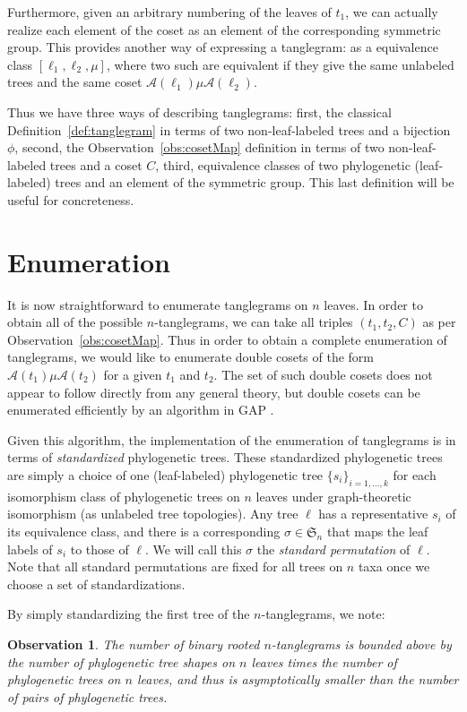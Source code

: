 \documentclass{amsart}
\newtheorem{observation}{Observation}
\newcommand{\fS}{\mathfrak S}
\newcommand{\aut}{\mathcal A}
\newcommand{\pairing}{\mu}
\begin{document}
Furthermore, given an arbitrary numbering of the leaves of $t_1$, we can actually realize each element of the coset as an element of the corresponding symmetric group.
This provides another way of expressing a tanglegram: as a equivalence class $[\ell_1, \ell_2, \pairing]$, where two such are equivalent if they give the same unlabeled trees and the same coset $\aut(\ell_1) \pairing \aut(\ell_2)$.

Thus we have three ways of describing tanglegrams:
first, the classical Definition~\ref{def:tanglegram} in terms of two non-leaf-labeled trees and a bijection $\phi$,
second, the Observation~\ref{obs:cosetMap} definition in terms of two non-leaf-labeled trees and a coset $C$,
third, equivalence classes of two phylogenetic (leaf-labeled) trees and an element of the symmetric group.
This last definition will be useful for concreteness.


\section{Enumeration}
It is now straightforward to enumerate tanglegrams on $n$ leaves.
In order to obtain all of the possible $n$-tanglegrams, we can take all triples $(t_1, t_2, C)$ as per Observation~\ref{obs:cosetMap}.
Thus in order to obtain a complete enumeration of tanglegrams, we would like to enumerate double cosets of the form $\aut(t_1) \pairing \aut(t_2)$ for a given $t_1$ and $t_2$.
The set of such double cosets does not appear to follow directly from any general theory, but double cosets can be enumerated efficiently by an algorithm in GAP \cite{GAP4}.

Given this algorithm, the implementation of the enumeration of tanglegrams is in terms of \emph{standardized} phylogenetic trees.
These standardized phylogenetic trees are simply a choice of one (leaf-labeled) phylogenetic tree $\{s_i\}_{i=1,\ldots,k}$ for each isomorphism class of phylogenetic trees on $n$ leaves under graph-theoretic isomorphism (as unlabeled tree topologies).
Any tree $\ell$ has a representative $s_i$ of its equivalence class, and there is a corresponding $\sigma \in \fS_n$ that maps the leaf labels of $s_i$ to those of $\ell$.
We will call this $\sigma$ the \emph{standard permutation} of $\ell$.
Note that all standard permutations are fixed for all trees on $n$ taxa once we choose a set of standardizations.

By simply standardizing the first tree of the $n$-tanglegrams, we note:
\begin{observation}
\label{obs:count}
The number of binary rooted $n$-tanglegrams is bounded above by the number of phylogenetic tree shapes on $n$ leaves times the number of phylogenetic trees on $n$ leaves, and thus is asymptotically smaller than the number of pairs of phylogenetic trees.
\end{observation}
\end{document}
